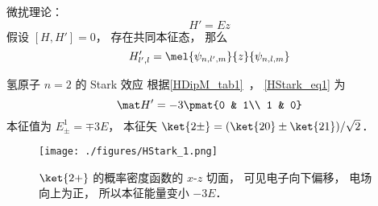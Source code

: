 
\begin{issues}
\issueDraft
\end{issues}


微扰理论：
\begin{equation}
H' = E z
\end{equation}
假设 $[H, H'] = 0$， 存在共同本征态， 那么
\begin{equation}\label{HStark_eq1}
H'_{l',l} = \mel{\psi_{n,l',m}}{z}{\psi_{n,l,m}}
\end{equation}


\begin{example}{氢原子 $n=2$ 的 Stark 效应}
根据\autoref{HDipM_tab1}~， \autoref{HStark_eq1} 为
\begin{equation}
\mat H' = -3\pmat{0 & 1\\ 1 & 0}
\end{equation}
本征值为 $E_{\pm}^1 = \mp 3E$， 本征矢 $\ket{2\pm} = (\ket{20} \pm \ket{21})/{\sqrt 2}$．

\begin{figure}[ht]
\centering
\texttt{[image: ./figures/HStark\_1.png]}
\caption{$\ket{2+}$ 的概率密度函数的 $x$-$z$ 切面， 可见电子向下偏移， 电场向上为正， 所以本征能量变小 $-3E$．} \label{HStark_fig1}
\end{figure}
\end{example}
